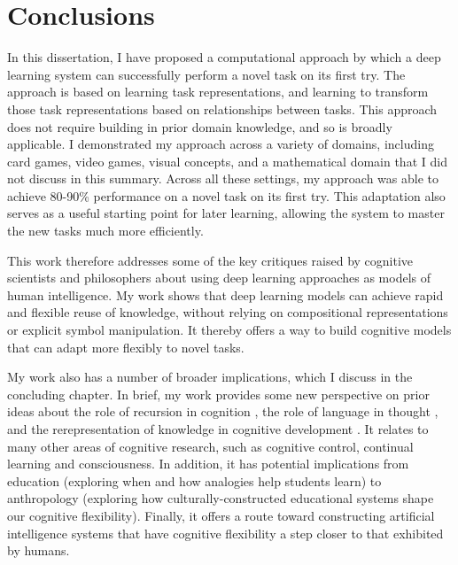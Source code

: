 \documentclass[12pt]{article}
\begin{document}
\section{Conclusions}

In this dissertation, I have proposed a computational approach by which a deep learning system can successfully perform a novel task on its first try. The approach is based on learning task representations, and learning to transform those task representations based on relationships between tasks. This approach does not require building in prior domain knowledge, and so is broadly applicable. I demonstrated my approach across a variety of domains, including card games, video games, visual concepts, and a mathematical domain that I did not discuss in this summary. Across all these settings, my approach was able to achieve 80-90\% performance on a novel task on its first try. This adaptation also serves as a useful starting point for later learning, allowing the system to master the new tasks much more efficiently. 

This work therefore addresses some of the key critiques raised by cognitive scientists and philosophers about using deep learning approaches as models of human intelligence. My work shows that deep learning models can achieve rapid and flexible reuse of knowledge, without relying on compositional representations or explicit symbol manipulation. It thereby offers a way to build cognitive models that can adapt more flexibly to novel tasks. 

My work also has a number of broader implications, which I discuss in the concluding chapter. In brief, my work provides some new perspective on prior ideas about the role of recursion in cognition \citep{Fodor2008lot2}, the role of language in thought \citep{Vygotsky1934}, and the rerepresentation of knowledge in cognitive development \citep{Karmiloff-Smith1986}. It relates to many other areas of cognitive research, such as cognitive control, continual learning and consciousness. In addition, it has potential implications from education (exploring when and how analogies help students learn) to anthropology (exploring how culturally-constructed educational systems shape our cognitive flexibility). Finally, it offers a route toward constructing artificial intelligence systems that have cognitive flexibility a step closer to that exhibited by humans. 



\end{document}

